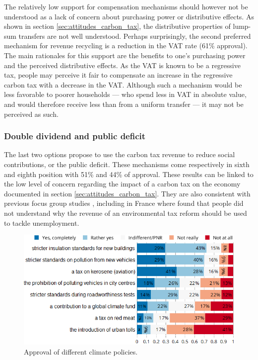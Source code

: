 \documentclass[english,5p,authoryear]{elsarticle}
\begin{document}
The relatively low support for compensation mechanisms should however not be understood as a lack of concern about purchasing power or distributive effects. As shown in section \ref{sec:attitudes_carbon_tax}, the distributive properties of lump-sum transfers are not well understood. Perhaps surprisingly, the second preferred mechanism for revenue recycling is a reduction in the VAT rate (61\% approval). The main rationales for this support are the benefits to one's purchasing power and the perceived distributive effects. As the VAT is known to be a regressive tax, people may perceive it fair to compensate an increase in the regressive carbon tax with a decrease in the VAT. Although such a mechanism would be less favorable to poorer households --- who spend less in VAT in absolute value, and would therefore receive less than from a uniform transfer --- it may not be perceived as such. %


        \subsubsection{Double dividend and public deficit}

The last two options propose to use the carbon tax revenue to reduce social contributions, or the public deficit. These mechanisms come respectively in sixth and eighth position with 51\% and 44\% of approval. These results can be linked to the low level of concern regarding the impact of a carbon tax on the economy documented in section \ref{sec:attitudes_carbon_tax}. They are also consistent with previous focus group studies \citep[e.g.][]{kallbekken_aasen_2010}, including in France where \citet{deroubaix_rise_2006} found that people did not understand why the revenue of an environmental tax reform should be used to tackle unemployment.


\begin{figure}[t]
\centering
\includegraphics[width=\columnwidth]{Images/environmental_policies.png}
\caption{Approval of different climate policies.}
\label{fig:policies}
\end{figure}
\end{document}

